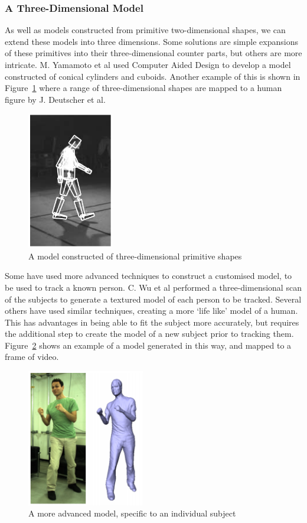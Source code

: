 \subsubsection{A Three-Dimensional Model}

As well as models constructed from primitive two-dimensional shapes, we can extend these models into three dimensions. Some solutions are simple expansions of these primitives into their three-dimensional counter parts, but others are more intricate. M. Yamamoto et al used Computer Aided Design to develop a model constructed of conical cylinders and cuboids\cite{cadmodel}. Another example of this is shown in Figure~\ref{fig:3dmodelajd} where a range of three-dimensional shapes are mapped to a human figure by J. Deutscher et al.

\begin{figure}[H]
    \centering
    \includegraphics[height=6cm]{background/images/3dpolygon}

	\caption{A model constructed of three-dimensional primitive shapes\cite{stickfigure}}
	\label{fig:3dmodelajd}
\end{figure}

Some have used more advanced techniques to construct a customised model, to be used to track a known person. C. Wu et al performed a three-dimensional scan of the subjects to generate a textured model of each person to be tracked\cite{capturystereopaper}. Several others have used similar techniques, creating a more `life like' model of a human. This has advantages in being able to fit the subject more accurately, but requires the additional step to create the model of a new subject prior to tracking them. Figure~\ref{fig:3dtexturedmodel} shows an example of a model generated in this way, and mapped to a frame of video.

\begin{figure}[H]
    \centering
    \includegraphics[height=6cm]{background/images/3dtexture}

	\caption{A more advanced model, specific to an individual subject\cite{capturystereopaper}}
	\label{fig:3dtexturedmodel}
\end{figure}